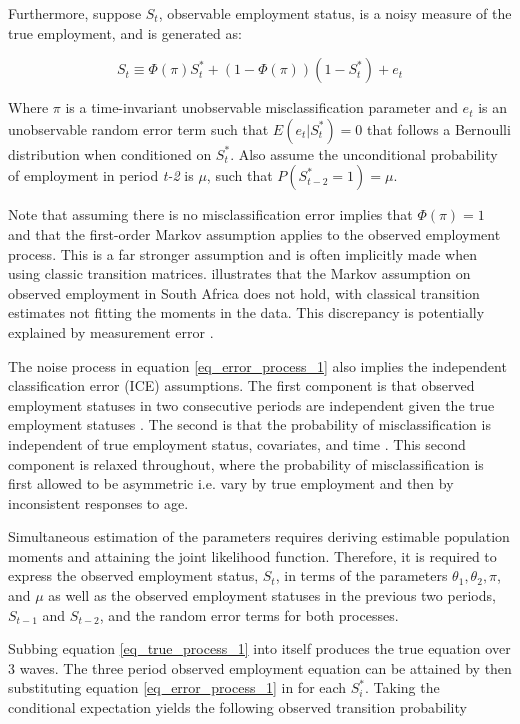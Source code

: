 \documentclass[letterpaper,12pt,final,dvipsnames]{article}
\begin{document}
Furthermore, suppose $S_t$, observable employment status, is a noisy measure of the true employment, and is generated as:

\begin{equation} \label{eq_error_process_1}
S_t \equiv \Phi(\pi) S_t^* + (1-\Phi(\pi))(1-S_t^*)+e_t
\end{equation}

Where $\pi$ is a time-invariant unobservable misclassification parameter and $e_t$ is an unobservable random error term such that $E(e_t |S_t^* )=0$ that follows a Bernoulli distribution when conditioned on $S_t^*$. Also assume the unconditional probability of employment in period \textit{t-2} is $\mu$, such that $P(S_{t-2}^*=1)=\mu$.

Note that assuming there is no misclassification error implies that $\Phi(\pi) = 1$ and that the first-order Markov assumption applies to the observed employment process. This is a far stronger assumption and is often implicitly made when using classic transition matrices. \cite{burger2016} illustrates that the Markov assumption on observed employment in South Africa does not hold, with classical transition estimates not fitting the moments in the data. This discrepancy is potentially explained by measurement error \citep{biemer2000, wolfe2003}. 

The noise process in equation \ref{eq_error_process_1} also implies the independent classification error (ICE) assumptions. The first component is that observed employment statuses in two consecutive periods are independent given the true employment statuses \citep{abowd1985, chua1987, porteba1986, singh1995, magnac1999}. The second is that the probability of misclassification is independent of true employment status, covariates, and time \citep{wolfe2003, burger2016, shibata2019}. This second component is relaxed throughout, where the probability of misclassification is first allowed to be asymmetric \textemdash i.e. vary by true employment \textemdash and then by inconsistent responses to age.

Simultaneous estimation of the parameters requires deriving estimable population moments and attaining the joint likelihood function. Therefore, it is required to express the observed employment status, $S_t$, in terms of the parameters $\theta_1, \theta_2, \pi$, and $\mu$ as well as the observed employment statuses in the previous two periods, $S_{t-1}$ and $S_{t-2}$, and the random error terms for both processes. 

Subbing equation \ref{eq_true_process_1} into itself produces the true equation over 3 waves. The three period observed employment equation can be attained by then substituting equation \ref{eq_error_process_1} in for each $S_i^*$. Taking the conditional expectation yields the following observed transition probability
\end{document}
